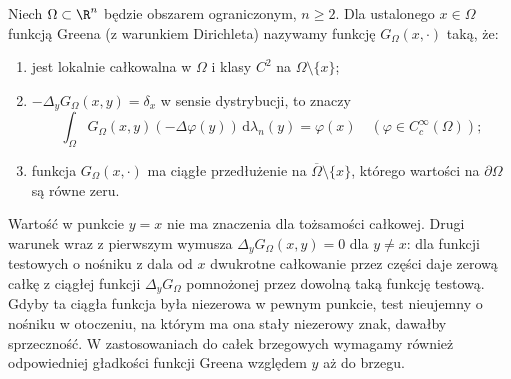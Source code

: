 \begin{definicja}
\label{def:pde3-green}
Niech $\Omega\subset\R^n$ będzie obszarem ograniczonym,
$n\geq2$. Dla ustalonego $x\in\Omega$ funkcją Greena
(z warunkiem Dirichleta) nazywamy funkcję
$G_\Omega(x,\cdot)$ taką, że:
\begin{enumerate}
\item jest lokalnie całkowalna w $\Omega$ i klasy
$C^2$ na $\Omega\setminus\{x\}$;
\item $-\Delta_yG_\Omega(x,y)=\delta_x$ w sensie
dystrybucji, to znaczy
\[
 \int_\Omega G_\Omega(x,y)(-\Delta\varphi(y))\,
 \mathrm d\lambda_n(y)=\varphi(x)
 \quad(\varphi\in C_c^\infty(\Omega));
\]
\item funkcja $G_\Omega(x,\cdot)$ ma ciągłe przedłużenie
na $\overline\Omega\setminus\{x\}$, którego wartości
na $\partial\Omega$ są równe zeru.
\end{enumerate}
Wartość w punkcie $y=x$ nie ma znaczenia dla tożsamości
całkowej. Drugi warunek wraz z pierwszym wymusza
$\Delta_yG_\Omega(x,y)=0$ dla $y\ne x$: dla funkcji
testowych o nośniku z dala od $x$ dwukrotne całkowanie
przez części daje zerową całkę z ciągłej funkcji
$\Delta_yG_\Omega$ pomnożonej przez dowolną taką funkcję
testową. Gdyby ta ciągła funkcja była niezerowa w pewnym
punkcie, test nieujemny o nośniku w otoczeniu, na którym
ma ona stały niezerowy znak, dawałby sprzeczność.
W zastosowaniach do całek brzegowych wymagamy również
odpowiedniej gładkości funkcji Greena względem $y$ aż do brzegu.
\end{definicja}

